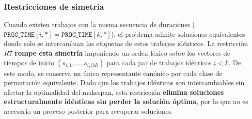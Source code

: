 \subsubsection*{Restricciones de simetría}
Cuando existen trabajos con la misma secuencia de duraciones (\(\texttt{PROC\_TIME}[i,*]=\texttt{PROC\_TIME}[k,*]\)), el problema admite soluciones equivalentes donde solo se intercambian las etiquetas de estos trabajos idénticos.
La restricción \(R7\) \textbf{rompe esta simetría} imponiendo un orden léxico sobre los vectores de tiempos de inicio \((s_{i,1},\dots,s_{i,|M|})\) para cada par de trabajos idénticos \(i<k\). De este modo, se conserva un único representante canónico por cada clase de permutación equivalente. Dado que los trabajos idénticos son intercambiables sin afectar la optimalidad del makespan, esta restricción \textbf{elimina soluciones estructuralmente idénticas sin perder la solución óptima}, por lo que no es necesario un proceso posterior para recuperar soluciones.